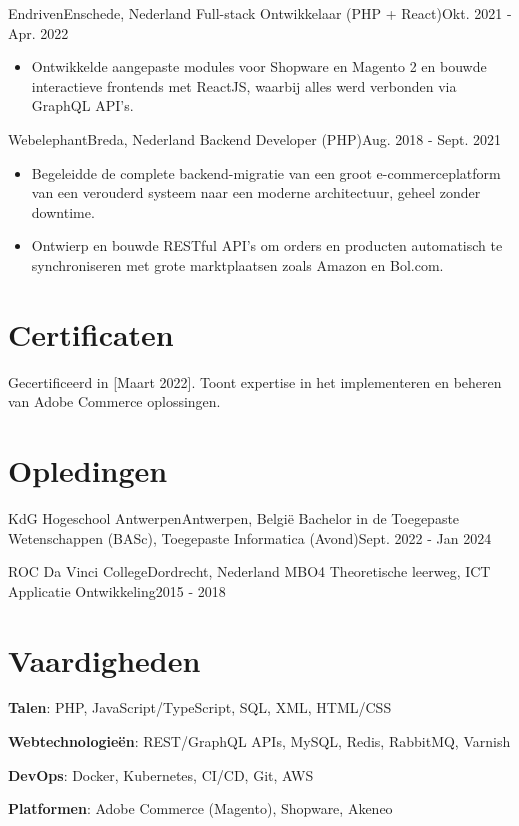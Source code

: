     \resumeSubheading
      {Endriven}{Enschede, Nederland}
      {Full-stack Ontwikkelaar (PHP + React)}{Okt. 2021 - Apr. 2022}
      \begin{itemize}
        \item Ontwikkelde aangepaste modules voor Shopware en Magento 2 en bouwde interactieve frontends met ReactJS, waarbij alles werd verbonden via GraphQL API's.
      \end{itemize}

    \resumeSubheading
      {Webelephant}{Breda, Nederland}
      {Backend Developer (PHP)}{Aug. 2018 - Sept. 2021}
      \begin{itemize}
        \item Begeleidde de complete backend-migratie van een groot e-commerceplatform van een verouderd systeem naar een moderne architectuur, geheel zonder downtime.
        \item Ontwierp en bouwde RESTful API's om orders en producten automatisch te synchroniseren met grote marktplaatsen zoals Amazon en Bol.com.
      \end{itemize}
      
  \resumeSubHeadingListEnd

\section{Certificaten}
  \resumeSubHeadingListStart
      {Gecertificeerd in [Maart 2022]. Toont expertise in het implementeren en beheren van Adobe Commerce oplossingen.}
  \resumeSubHeadingListEnd

\section{Opledingen}
  \resumeSubHeadingListStart
    \resumeSubheading
      {KdG Hogeschool Antwerpen}{Antwerpen, België}
      {Bachelor in de Toegepaste Wetenschappen (BASc), Toegepaste Informatica (Avond)}{Sept. 2022 - Jan 2024}
      
    \resumeSubheading
      {ROC Da Vinci College}{Dordrecht, Nederland}
      {MBO4 Theoretische leerweg, ICT Applicatie Ontwikkeling}{2015 - 2018}
  \resumeSubHeadingListEnd

\section{Vaardigheden}
 \resumeSubHeadingListStart
   \item{
     \textbf{Talen}{: PHP, JavaScript/TypeScript, SQL, XML, HTML/CSS}
   }
   \item{
     \textbf{Webtechnologieën}{: REST/GraphQL APIs, MySQL, Redis, RabbitMQ, Varnish}
   }
   \item{
     \textbf{DevOps}{: Docker, Kubernetes, CI/CD, Git, AWS}
   }
   \item{
      \textbf{Platformen}{: Adobe Commerce (Magento), Shopware, Akeneo}
   }
 \resumeSubHeadingListEnd

